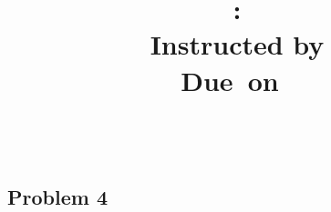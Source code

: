 \documentclass{article}
\title{\textmd{\bf \Class: \Title}\\{\large Instructed by \textit{\ClassInstructor}}\\\normalsize\vspace{0.1in}\small{Due\ on\ \DueDate}}
\date{}
\author{\textbf{\StudentName}\ \ \AndrewID}
\begin{document}
\begin{spacing}{1.1}
\maketitle \thispagestyle{empty}



\section{Problem 4}


\end{spacing}
\end{document}
